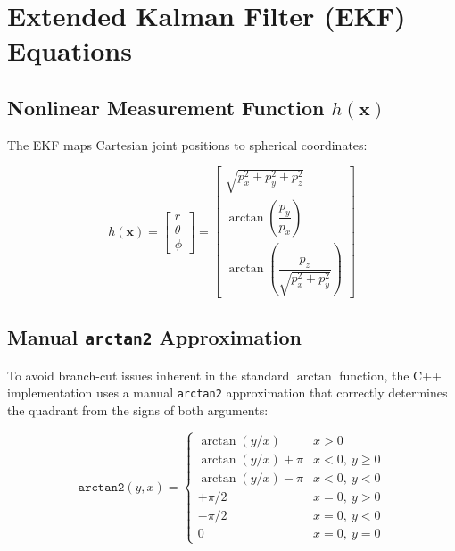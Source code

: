 \documentclass[12pt, a4paper]{article}
\begin{document}
\section{Extended Kalman Filter (EKF) Equations}

\subsection{Nonlinear Measurement Function \texorpdfstring{$h(\mathbf{x})$}{h(x)}}

The EKF maps Cartesian joint positions to spherical coordinates:

\begin{equation}
h(\mathbf{x}) = \begin{bmatrix} r \\ \theta \\ \phi \end{bmatrix}
= \begin{bmatrix}
\sqrt{p_x^2 + p_y^2 + p_z^2} \\
\arctan\!\left(\dfrac{p_y}{p_x}\right) \\
\arctan\!\left(\dfrac{p_z}{\sqrt{p_x^2+p_y^2}}\right)
\end{bmatrix}
\label{eq:h}
\end{equation}

\subsection{Manual \texttt{arctan2} Approximation}

To avoid branch-cut issues inherent in the standard $\arctan$ function, the C++ implementation uses a manual \texttt{arctan2} approximation that correctly determines the quadrant from the signs of both arguments:

\begin{equation}
\texttt{arctan2}(y, x) = \begin{cases}
\arctan(y/x)           & x > 0 \\
\arctan(y/x) + \pi     & x < 0,\ y \geq 0 \\
\arctan(y/x) - \pi     & x < 0,\ y < 0 \\
+\pi/2                 & x = 0,\ y > 0 \\
-\pi/2                 & x = 0,\ y < 0 \\
0                      & x = 0,\ y = 0
\end{cases}
\label{eq:arctan2}
\end{equation}
\end{document}
